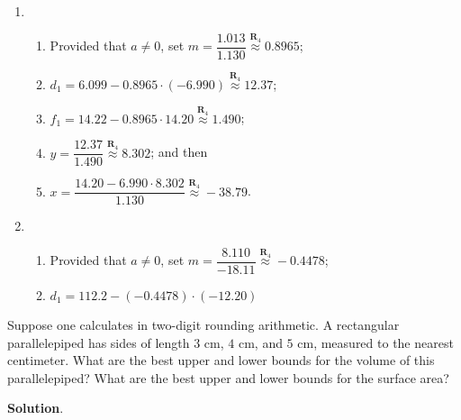 \documentclass[11pt]{article}
\theoremstyle{break}
\numberwithin{equation}{theorem}
\begin{document}
\begin{enumerate}
    \item \begin{enumerate}[label=\arabic*.]
        \item Provided that $a\ne 0$, set $m=\dfrac{1.013}{1.130}\overset{\textbf{R}_4}{\approx}0.8965$;
        \item $d_1=6.099-0.8965\cdot(-6.990)\overset{\textbf{R}_4}{\approx}12.37$;
        \item $f_1=14.22-0.8965\cdot14.20\overset{\textbf{R}_4}{\approx}1.490$;
        \item $y=\dfrac{12.37}{1.490}\overset{\textbf{R}_4}{\approx}8.302$; and then
        \item $x=\dfrac{14.20-6.990\cdot8.302}{1.130}\overset{\textbf{R}_4}{\approx}-38.79$.
    \end{enumerate}
    \item \begin{enumerate}[label=\arabic*.]
        \item Provided that $a\ne 0$, set $m=\dfrac{8.110}{-18.11}\overset{\textbf{R}_4}{\approx}-0.4478$;
        \item $d_1=112.2-(-0.4478)\cdot(-12.20)$
    \end{enumerate}
\end{enumerate}

\begin{problem}\label{problem 9}
    Suppose one calculates in two-digit rounding arithmetic. A rectangular parallelepiped has sides of length $3$ cm, $4$ cm, and $5$ cm, measured to the nearest centimeter. What are the best upper and lower bounds for the volume of this parallelepiped? What are the best upper and lower bounds for the surface area?
\end{problem}
\textbf{Solution}.
\end{document}
